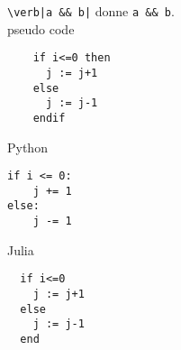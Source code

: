 \documentclass{article}
\begin{document}
  \verb#\verb|a && b|# donne \verb|a && b|.\\
  pseudo code
  \begin{verbatim}
    if i<=0 then
      j := j+1
    else
      j := j-1
    endif
  \end{verbatim}
  Python
  \begin{verbatim}
if i <= 0:
    j += 1
else:
    j -= 1
  \end{verbatim}
  Julia
  \begin{verbatim}
  if i<=0
    j := j+1
  else
    j := j-1
  end
  \end{verbatim}
\end{document}
